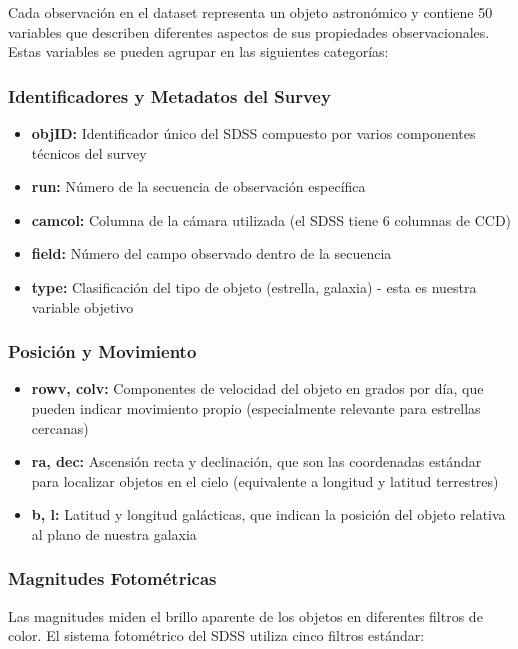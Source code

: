 \documentclass{article}
\begin{document}
Cada observación en el dataset representa un objeto astronómico y contiene 50 variables que describen diferentes aspectos de sus propiedades observacionales. Estas variables se pueden agrupar en las siguientes categorías:

\subsubsection{Identificadores y Metadatos del Survey}

\begin{itemize}
    \item \textbf{objID:} Identificador único del SDSS compuesto por varios componentes técnicos del survey
    \item \textbf{run:} Número de la secuencia de observación específica
    \item \textbf{camcol:} Columna de la cámara utilizada (el SDSS tiene 6 columnas de CCD)
    \item \textbf{field:} Número del campo observado dentro de la secuencia
    \item \textbf{type:} Clasificación del tipo de objeto (estrella, galaxia) - esta es nuestra variable objetivo
\end{itemize}

\subsubsection{Posición y Movimiento}

\begin{itemize}
    \item \textbf{rowv, colv:} Componentes de velocidad del objeto en grados por día, que pueden indicar movimiento propio (especialmente relevante para estrellas cercanas)
    \item \textbf{ra, dec:} Ascensión recta y declinación, que son las coordenadas estándar para localizar objetos en el cielo (equivalente a longitud y latitud terrestres)
    \item \textbf{b, l:} Latitud y longitud galácticas, que indican la posición del objeto relativa al plano de nuestra galaxia
\end{itemize}

\subsubsection{Magnitudes Fotométricas}

Las magnitudes miden el brillo aparente de los objetos en diferentes filtros de color. El sistema fotométrico del SDSS utiliza cinco filtros estándar:
\end{document}
